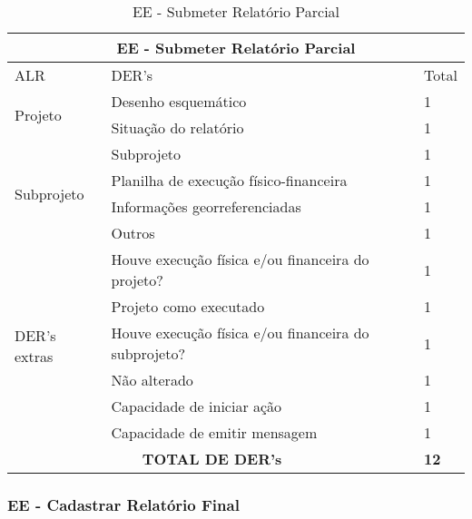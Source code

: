 \begin{table}[!h]
\centering
\caption{EE - Submeter Relatório Parcial}
\label{ee_submeter_relatorio_parcial}
\begin{tabular}{|l|l|l|}
\hline
\multicolumn{3}{|c|}{EE - Submeter Relatório Parcial}                                                                 \\ \hline
ALR                           & DER's                                                & Total              \\ \hline
\multirow{2}{*}{Projeto}    & Desenho esquemático  & 1                  \\ \cline{2-3} 
                             & Situação do relatório & 1 \\ \hline
\multirow{4}{*}{Subprojeto}   & Subprojeto & 1 \\ \cline{2-3}
                              & Planilha de execução físico-financeira               & 1                  \\ \cline{2-3} 
                              & Informações georreferenciadas                        & 1                  \\ \cline{2-3} 
                              & Outros  & 1                  \\ \hline
\multirow{6}{*}{DER's extras} & Houve execução física e/ou financeira do projeto? & 1                  \\ \cline{2-3} 
                              & Projeto como executado & 1 \\ \cline{2-3}
                              & Houve execução física e/ou financeira do subprojeto?    & 1                  \\ \cline{2-3} 
			      & Não alterado                                         & 1                  \\ \cline{2-3} 
                              & Capacidade de iniciar ação                           & 1\\ \cline{2-3}
                              & Capacidade de emitir mensagem                        &1                    \\ \hline
\multicolumn{2}{|c|}{\textbf{TOTAL DE DER's}}                                                 & \textbf{12}                 \\ \hline
\end{tabular}
\end{table}


\vfill
\pagebreak
  \subsubsection{EE - Cadastrar Relatório Final}
  
